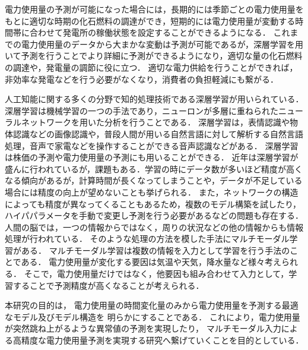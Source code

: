 \documentclass[twocolumn,fleqn,10pt]{jarticle}
\makeatletter
\renewcommand{\subsection}{\@startsection
{subsection}{3}{0mm}{5mm}{0.01pt}{\bfseries \normalsize}}
\makeatother
\begin{document}
電力使用量の予測が可能になった場合には，長期的には季節ごとの電力使用量をもとに適切な時期の化石燃料の調達ができ，短期的には電力使用量が変動する時間帯に合わせて発電所の稼働状態を設定することができるようになる．
これまでの電力使用量のデータから大まかな変動は予測が可能であるが，深層学習を用いて予測を行うことでより詳細に予測ができるようになり，適切な量の化石燃料の調達や，発電量の調節に役に立つ\cite{kama}．
適切な電力供給を行うことができれば，非効率な発電などを行う必要がなくなり，消費者の負担軽減にも繋がる\cite{matsuo}．


人工知能に関する多くの分野で知的処理技術である深層学習が用いられている．
深層学習は機械学習の一つの手法であり，ニューロンが多層に重ねられたニューラルネットワークを用いた分析を行うことである\cite{asakawa}．
深層学習は，表情認識や物体認識などの画像認識や，普段人間が用いる自然言語に対して解析する自然言語処理，音声で家電などを操作することができる音声認識などがある．
深層学習は株価の予測や電力使用量の予測にも用いることができる．
近年は深層学習が盛んに行われているが，課題もある．学習の時にデータ数が多いほど精度が高くなる傾向があるが，計算時間が長くなってしまうことや，データが不足している場合には精度の向上が望めないことも挙げられる．
また，ネットワークの構造によっても精度が異なってくることもあるため，複数のモデル構築を試したり，ハイパパラメータを手動で変更し予測を行う必要があるなどの問題も存在する．
人間の脳では，一つの情報からではなく，周りの状況などの他の情報からも情報処理が行われている．
そのような処理の方法を模した手法にマルチモーダル学習がある．
マルチモーダル学習は複数の情報を入力として学習を行う手法のことである．
電力使用量が変化する要因は気温や天気，降水量など様々考えられる．
そこで，電力使用量だけではなく，他要因も組み合わせて入力として，学習することで予測精度が高くなることが考えられる．


本研究の目的は，
電力使用量の時間変化量のみから電力使用量を予測する最適なモデル及びモデル構造を
明らかにすることである．
これにより，電力使用量が突然跳ね上がるような異常値の予測を実現したり，
マルチモーダル入力による高精度な電力使用量予測を実現する研究へ繋げていくことを目的としている．

\end{document}
